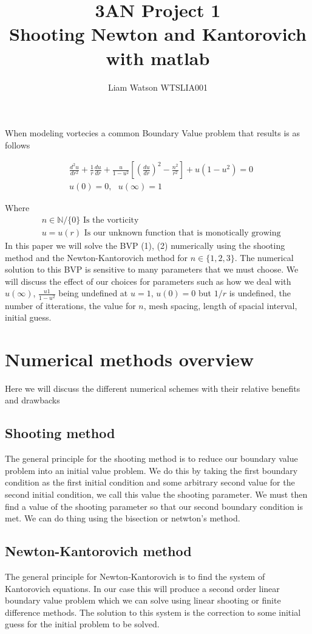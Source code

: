\documentclass{article}
\title{3AN Project 1\\ Shooting Newton and Kantorovich with matlab}
\author{Liam Watson WTSLIA001}
\begin{document}
\maketitle
When modeling vortecies a common Boundary Value problem that results is as follows


\begin{align}
&\frac{d^2 u}{dr^2} + \frac{1}{r}\frac{du}{dr} + \frac{u}{1-u^2}\left[\left(\frac{du}{dr}\right)^2 - \frac{n^2}{r^2}\right] + u(1-u^2) = 0 \\
&u(0) = 0,\ \ \  u(\infty) = 1
\end{align}

Where 
\begin{align*}
&n\in \mathbb{N}/\{0\} \text{ Is the vorticity} \\
&u = u(r)  \text{ Is our unknown function that is monotically growing} 
\end{align*}
In this paper we will solve the BVP (1), (2) numerically using the shooting method and the Newton-Kantorovich method for $n\in \{1,2,3\}$. The numerical solution to this BVP is sensitive to many parameters that we must choose. We will discuss the effect of our choices for parameters such as how we deal with $u(\infty)$, $\frac{u1}{1-u^2}$ being undefined at $u = 1$, $u(0) = 0$ but $1/r$ is undefined, the number of itterations, the value for $n$, mesh spacing, length of spacial interval, initial guess.

\section{Numerical methods overview}
Here we will discuss the different numerical schemes with their relative benefits and drawbacks 
\subsection{Shooting method}
The general principle for the shooting method is to reduce our boundary value problem into an initial value problem. We do this by taking the first boundary condition as the first initial condition and some arbitrary second value for the second initial condition, we call this value the shooting parameter. We must then find a value of the shooting parameter so that our second boundary condition is met. We can do thing using the bisection or netwton's method.     
\subsection{Newton-Kantorovich method}
The general principle for Newton-Kantorovich is to find the system of Kantorovich equations. In our case this will produce a second order linear boundary value problem which we can solve using linear shooting or finite difference methods. The solution to this system is the correction to some initial guess for the initial problem to be solved.  
\end{document}
